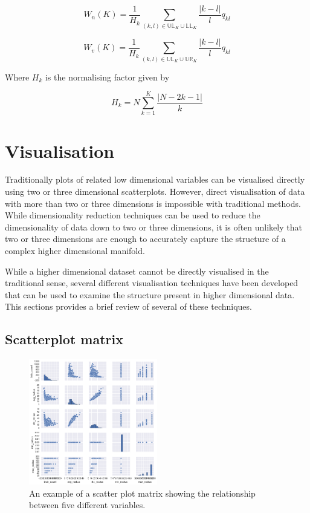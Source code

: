 \begin{equation}
	W_n(K) = \frac{1}{H_k} \sum\limits_{(k,l) \in \mathbb{UL}_K \cup \mathbb{LL}_K} \frac{| k - l |}{l} q_{kl}
\end{equation}

\begin{equation}
	W_v(K) = \frac{1}{H_k} \sum\limits_{(k,l) \in \mathbb{UL}_K \cup \mathbb{UR}_K} \frac{| k - l |}{l} q_{kl}
\end{equation}

Where $H_k$ is the normalising factor given by

\begin{equation}
	H_k = N \sum\limits_{k=1}^K \frac{| N - 2k -1 |}{k}
\end{equation}

\section{Visualisation}
\label{sec:visualisation}
Traditionally plots of related low dimensional variables can be visualised directly using two or three dimensional scatterplots. However, direct visualisation of data with more than two or three dimensions is impossible with traditional methods. While dimensionality reduction techniques can be used to reduce the dimensionality of data down to two or three dimensions, it is often unlikely that two or three dimensions are enough to accurately capture the structure of a complex higher dimensional manifold.

While a higher dimensional dataset cannot be directly visualised in the traditional sense, several different visualisation techniques have been developed that can be used to examine the structure present in higher dimensional data. This sections provides a brief review of several of these techniques.

\subsection{Scatterplot matrix}

\begin{figure}[H]
	\label{fig:scatterplot-matrix}
	\centering
	\includegraphics[width=0.5\textwidth]{Images/scatterplot-matrix.png}	
	\caption{An example of a scatter plot matrix showing the relationship between five different variables.}
\end{figure}

